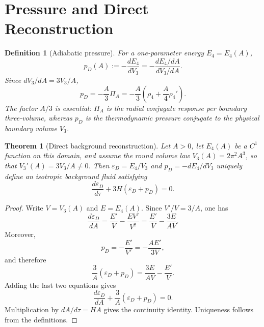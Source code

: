 \documentclass[11pt,a4paper]{article}
\def\dd{d}%
\numberwithin{equation}{section}
\newtheorem{definition}[criterion]{Definition}
\newtheorem{theorem}[criterion]{Theorem}
\theoremstyle{remark}
\newcommand{\Efour}{E_4}
\newcommand{\rhoFour}{\rho_4}
\newcommand{\epsD}{\varepsilon_D}
\newcommand{\pD}{p_D}
\newcommand{\PiA}{\Pi_A}
\newcommand{\dd}{\mathrm{d}}
\begin{document}
\section{Pressure and Direct Reconstruction}
\begin{definition}[Adiabatic pressure]
For a one-parameter energy \(\Efour=\Efour(A)\),
\begin{equation}
\pD(A):=-\frac{\dd\Efour}{\dd V_3}
=-\frac{\dd\Efour/\dd A}{\dd V_3/\dd A}.
\end{equation}
Since \(\dd V_3/\dd A=3V_3/A\),
\begin{equation}
\pD=-\frac{A}{3}\PiA
=-\frac{A}{3}\left(\rhoFour+\frac{A}{4}\rhoFour'\right).
\end{equation}
The factor \(A/3\) is essential: \(\PiA\) is the radial conjugate response per boundary three-volume, whereas \(\pD\) is the thermodynamic pressure conjugate to the physical boundary volume \(V_3\).
\end{definition}

\begin{theorem}[Direct background reconstruction]
Let \(A>0\), let \(\Efour(A)\) be a \(C^1\) function on this domain, and assume the round volume law \(V_3(A)=2\pi^2A^3\), so that \(V_3'(A)=3V_3/A\neq0\). Then \(\epsD=\Efour/V_3\) and \(\pD=-\dd\Efour/\dd V_3\) uniquely define an isotropic background fluid satisfying
\begin{equation}
\frac{\dd\epsD}{\dd\tau}+3H(\epsD+\pD)=0.
\end{equation}
\end{theorem}
\begin{proof}
Write \(V=V_3(A)\) and \(E=\Efour(A)\). Since \(V'/V=3/A\), one has
\begin{equation}
\frac{\dd\epsD}{\dd A}
=\frac{E'}{V}-\frac{EV'}{V^2}
=\frac{E'}{V}-\frac{3E}{AV}.
\end{equation}
Moreover,
\begin{equation}
\pD=-\frac{E'}{V'}
=-\frac{AE'}{3V},
\end{equation}
and therefore
\begin{equation}
\frac{3}{A}(\epsD+\pD)
=\frac{3E}{AV}-\frac{E'}{V}.
\end{equation}
Adding the last two equations gives
\begin{equation}
\frac{\dd\epsD}{\dd A}
+\frac{3}{A}(\epsD+\pD)=0.
\end{equation}
Multiplication by \(\dd A/\dd\tau=HA\) gives the continuity identity. Uniqueness follows from the definitions.
\end{proof}
\end{document}
